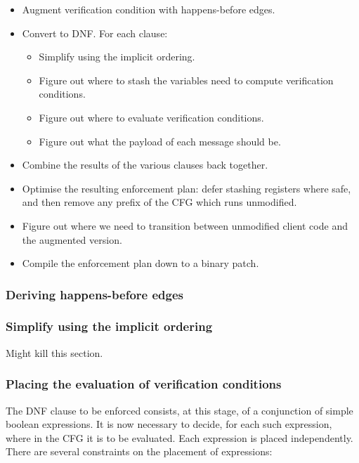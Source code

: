 \documentclass[12pt,a4paper]{book}
\begin{document}
\begin{itemize}
\item
  Augment verification condition with happens-before edges.
\item
  Convert to DNF.
  For each clause:
  \begin{itemize}
  \item
    Simplify using the implicit ordering.
  \item
    Figure out where to stash the variables need to compute verification conditions.
  \item
    Figure out where to evaluate verification conditions.
  \item
    Figure out what the payload of each message should be.
  \end{itemize}
\item
  Combine the results of the various clauses back together.
\item
  Optimise the resulting enforcement plan: defer stashing registers where safe, and then remove any prefix of the CFG which runs unmodified.
\item
  Figure out where we need to transition between unmodified client code and the augmented version.
\item
  Compile the enforcement plan down to a binary patch.
\end{itemize}

\subsubsection{Deriving happens-before edges}

\subsubsection{Simplify using the implicit ordering}
Might kill this section.

\subsubsection{Placing the evaluation of verification conditions}
The DNF clause to be enforced consists, at this stage, of a conjunction of simple boolean expressions.
It is now necessary to decide, for each such expression, where in the CFG it is to be evaluated.
Each expression is placed independently.
There are several constraints on the placement of expressions:
\end{document}
